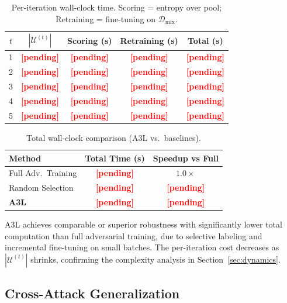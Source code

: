 \documentclass[review,1p,times,number]{elsarticle}
\newcommand{\TODO}[1]{\textcolor{red}{\textbf{[#1]}}}
\begin{document}
\begin{table}[htbp]
\caption{Per-iteration wall-clock time. Scoring = entropy over pool;
  Retraining = fine-tuning on $\mathcal{D}_{\mathrm{mix}}$.}
\label{tab:wallclock}
\centering
\begin{tabular}{@{}ccccc@{}}
\toprule
$t$ & $|\mathcal{U}^{(t)}|$ & Scoring (s) & Retraining (s)
  & Total (s) \\
\midrule
1 & \TODO{pending} & \TODO{pending} & \TODO{pending} & \TODO{pending} \\
2 & \TODO{pending} & \TODO{pending} & \TODO{pending} & \TODO{pending} \\
3 & \TODO{pending} & \TODO{pending} & \TODO{pending} & \TODO{pending} \\
4 & \TODO{pending} & \TODO{pending} & \TODO{pending} & \TODO{pending} \\
5 & \TODO{pending} & \TODO{pending} & \TODO{pending} & \TODO{pending} \\
\bottomrule
\end{tabular}
\end{table}

\begin{table}[htbp]
\caption{Total wall-clock comparison (A3L vs.\ baselines).}
\label{tab:wallclock_compare}
\centering
\begin{tabular}{@{}lcc@{}}
\toprule
\textbf{Method} & \textbf{Total Time (s)} & \textbf{Speedup vs Full} \\
\midrule
Full Adv.\ Training & \TODO{pending} & $1.0\times$ \\
Random Selection     & \TODO{pending} & \TODO{pending} \\
\textbf{A3L}         & \TODO{pending} & \TODO{pending} \\
\bottomrule
\end{tabular}
\end{table}

A3L achieves comparable or superior robustness with significantly lower
total computation than full adversarial training, due to selective
labeling and incremental fine-tuning on small batches. The per-iteration
cost decreases as $|\mathcal{U}^{(t)}|$ shrinks, confirming the
complexity analysis in Section~\ref{sec:dynamics}.

\subsection{Cross-Attack Generalization}
\label{sec:crossattack}
\end{document}
